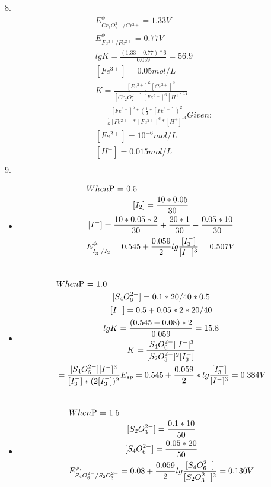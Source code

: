 \documentclass{article}
\begin{document}
8.\begin{equation}
    \begin{multlined}
        E^{\phi}_{Cr_2O_7^{2-}/Cr^{3+}} = 1.33 V\\
        E^{\phi}_{Fe^{3+}/Fe^{2+}} = 0.77V\\
        lgK = \frac{(1.33 - 0.77)*6}{0.059} = 56.9\\
        [Fe^{3+}] = 0.05 mol/L\\
        K = \frac{[Fe^{3+}]^6[Cr^{3+}]^2}{[Cr_2O_7^{2-}][Fe^{2+}]^6[H^+]^14}\\
        = \frac{[Fe^{3+}]^6*(\frac{1}{3}*[Fe^{3+}])^2}{\frac{1}{6}[Fe^{2+}]*[Fe^{2+}]^6*[H^+]^14}
        Given:\\
        [Fe^{2+}] = 10^{-6}mol/L\\
        [H^+] = 0.015 mol/L\\
    \end{multlined}
\end{equation}
9.\begin{itemize}
    \item 
\begin{equation}
    \begin{multlined}
        When $P = 0.5$\\
        [I_2] = \frac{10*0.05}{30}\\
        [I^-] = \frac{10*0.05*2}{30} + \frac{20*1}{30} - \frac{0.05*10}{30}\\
        E^{\phi,}_{I_3^-/I_2} = 0.545 + \frac{0.059}{2}lg\frac{[I_3^-]}{[I^-]^3} = 0.507 V\\
    \end{multlined}
\end{equation}
    \item
    \begin{equation}
        \begin{multlined}
            When $P = 1.0$\\
            [S_4O_6^{2-}] = 0.1*20/40*0.5\\
            [I^-] = 0.5 + 0.05*2*20/40\\
            lgK = \frac{(0.545 - 0.08)*2}{0.059} = 15.8\\
            K = \frac{[S_4O_6^{2-}][I^-]^3}{[S_2O_3^{2-}]^{2}[I_3^-]}\\
            = \frac{[S_4O_6^{2-}][I^-]^3}{[I_3^-]*(2[I_3^-])^2}
            E_{sp} = 0.545 + \frac{0.059}{2}*lg\frac{[I_3^-]}{[I^-]^3} = 0.384 V\\
        \end{multlined}
    \end{equation}
    \item
    \begin{equation}
    \begin{multlined}
    When $P = 1.5$\\
        [S_2O_3^{2-}] = \frac{0.1*10}{50}\\
        [S_4O_6^{2-}] = \frac{0.05*20}{50}\\
        E^{\phi,}_{S_4O_6^{2-}/S_2O_3^{2-}} = 0.08 + \frac{0.059}{2}lg\frac{[S_4O_6^{2-}]}{[S_2O_3^{2-}]^2} = 0.130 V\\
    \end{multlined}
    \end{equation}
\end{itemize}
\end{document}
